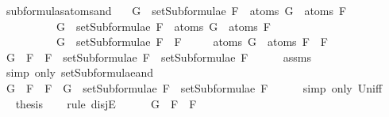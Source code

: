 \begin{isabellebody}
%
\endisadelimproof
\isanewline
{}\isamarkupfalse%
\ subformulas{\isacharunderscore}atoms{\isacharunderscore}and{\isacharcolon}\isanewline
\ \ \ {\isachardoublequoteopen}G\ {\isasymin}\ setSubformulae\ F{}\ {\isasymLongrightarrow}\ atoms\ G\ {\isasymsubseteq}\ atoms\ F{}{\isachardoublequoteclose}\isanewline
\ \ \ \ \ \ \ \ \ \ {\isachardoublequoteopen}G\ {\isasymin}\ setSubformulae\ F{}\ {\isasymLongrightarrow}\ atoms\ G\ {\isasymsubseteq}\ atoms\ F{}{\isachardoublequoteclose}\isanewline
\ \ \ \ \ \ \ \ \ \ {\isachardoublequoteopen}G\ {\isasymin}\ setSubformulae\ {\isacharparenleft}F{}\ \isactrlbold {\isasymand}\ F{}{\isacharparenright}{\isachardoublequoteclose}\isanewline
\ \ \ \ \ {\isachardoublequoteopen}atoms\ G\ {\isasymsubseteq}\ atoms\ {\isacharparenleft}F{}\ \isactrlbold {\isasymand}\ F{}{\isacharparenright}{\isachardoublequoteclose}\isanewline
%
\isadelimproof
%
\endisadelimproof
%
\isatagproof
{}\isamarkupfalse%
\ {\isacharminus}\isanewline
\ \ \isamarkupfalse%
\ {\isachardoublequoteopen}G\ {\isasymin}\ {\isacharbraceleft}F{}\ \isactrlbold {\isasymand}\ F{}{\isacharbraceright}\ {\isasymunion}\ {\isacharparenleft}setSubformulae\ F{}\ {\isasymunion}\ setSubformulae\ F{}{\isacharparenright}{\isachardoublequoteclose}\isanewline
\ \ \ \ \isamarkupfalse%
\ assms{\isacharparenleft}{}{\isacharparenright}\ \isanewline
\ \ \ \ \isamarkupfalse%
\ {\isacharparenleft}simp\ only{\isacharcolon}\ setSubformulae{\isacharunderscore}and{\isacharparenright}\isanewline
\ \ \isamarkupfalse%
\ \isamarkupfalse%
\ {\isachardoublequoteopen}G\ {\isasymin}\ {\isacharbraceleft}F{}\ \isactrlbold {\isasymand}\ F{}{\isacharbraceright}\ {\isasymor}\ G\ {\isasymin}\ setSubformulae\ F{}\ {\isasymunion}\ setSubformulae\ F{}{\isachardoublequoteclose}\isanewline
\ \ \ \ \isamarkupfalse%
\ {\isacharparenleft}simp\ only{\isacharcolon}\ Un{\isacharunderscore}iff{\isacharparenright}\isanewline
\ \ \isamarkupfalse%
\ \isamarkupfalse%
\ {\isacharquery}thesis\isanewline
\ \ \isamarkupfalse%
\ {\isacharparenleft}rule\ disjE{\isacharparenright}\isanewline
\ \ \ \ \isamarkupfalse%
\ {\isachardoublequoteopen}G\ {\isasymin}\ {\isacharbraceleft}F{}\ \isactrlbold {\isasymand}\ F{}{\isacharbraceright}{\isachardoublequoteclose}\isanewline

\end{isabellebody}
